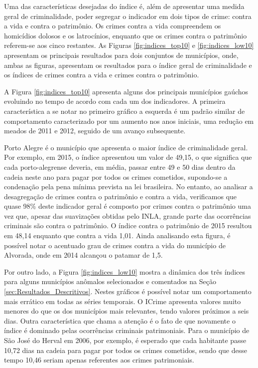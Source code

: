 \documentclass[12pt,openright,oneside,a4paper,english,french,spanish]{abntex2}
\numberwithin{table}{section} %
\numberwithin{figure}{section} %
\begin{document}
Uma das características desejadas do índice é, além de apresentar uma medida geral de criminalidade, poder segregar o indicador em dois tipos de crime: contra a vida e contra o patrimônio. Os crimes contra a vida compreendem os homicídios dolosos e os latrocínios, enquanto que os crimes contra o patrimônio referem-se aos cinco restantes. As Figuras \ref{fig:indices_top10} e \ref{fig:indices_low10} apresentam os principais resultados para dois conjuntos de municípios, onde, ambas as figuras, apresentam os resultados para o índice geral de criminalidade e os índices de crimes contra a vida e crimes contra o patrimônio.

A Figura \ref{fig:indices_top10} apresenta alguns dos principais municípios gaúchos evoluindo no tempo de acordo com cada um dos indicadores. A primeira característica a se notar no primeiro gráfico a esquerda é um padrão similar de comportamento caracterizado por um aumento nos anos iniciais, uma redução em meados de 2011 e 2012, seguido de um avanço subsequente. 

Porto Alegre é o município que apresenta o maior índice de criminalidade geral. Por exemplo, em 2015, o índice apresentou um valor de 49,15, o que significa que cada porto-alegrense deveria, em média, passar entre 49 e 50 dias dentro da cadeia neste ano para pagar por todos os crimes cometidos, supondo-se a condenação pela pena mínima prevista na lei brasileira. No entanto, ao analisar a desagregação de crimes contra o patrimônio e contra a vida, verificamos que quase 98\% deste indicador geral é composto por crimes contra o patrimônio uma vez que, apesar das suavizações obtidas pelo INLA, grande parte das ocorrências criminais são contra o patrimônio. O índice contra o patrimônio de 2015 resultou em 48,14 enquanto que contra a vida 1,01. Ainda analisando esta figura, é possível notar o acentuado grau de crimes contra a vida do município de Alvorada, onde em 2014 alcançou o patamar de 1,5.

Por outro lado, a Figura \ref{fig:indices_low10} mostra a dinâmica dos três índices para alguns municípios anômalos selecionados e comentados na Seção \ref{sec:Resultados_Descritivos}. Nestes gráficos é possível notar um comportamento mais errático em todas as séries temporais. O ICrime apresenta valores muito menores do que os dos municípios mais relevantes, tendo valores próximos a seis dias. Outra característica que chama a atenção é o fato de que novamente o índice é dominado pelas ocorrências criminais patrimoniais. Para o município de São José do Herval em 2006, por exemplo, é esperado que cada habitante passe 10,72 dias na cadeia para pagar por todos os crimes cometidos, sendo que desse tempo 10,46 seriam apenas referentes aos crimes patrimoniais. 
\end{document}

